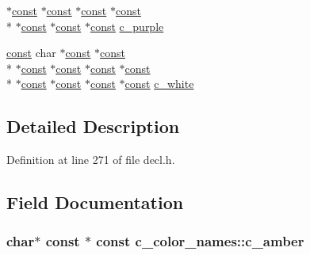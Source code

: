 \begin{DoxyCompactItemize}
$\ast$\hyperlink{tradstdc_8h_a2c212835823e3c54a8ab6d95c652660e}{const} $\ast$\hyperlink{tradstdc_8h_a2c212835823e3c54a8ab6d95c652660e}{const} $\ast$\hyperlink{tradstdc_8h_a2c212835823e3c54a8ab6d95c652660e}{const} $\ast$\hyperlink{tradstdc_8h_a2c212835823e3c54a8ab6d95c652660e}{const} \\*
$\ast$\hyperlink{tradstdc_8h_a2c212835823e3c54a8ab6d95c652660e}{const} $\ast$\hyperlink{tradstdc_8h_a2c212835823e3c54a8ab6d95c652660e}{const} $\ast$\hyperlink{tradstdc_8h_a2c212835823e3c54a8ab6d95c652660e}{const} \hyperlink{structc__color__names_a67c3d57a3672c8c1b0f0224442df81c4}{c\+\_\+purple}
\item 
\hyperlink{tradstdc_8h_a2c212835823e3c54a8ab6d95c652660e}{const} char $\ast$\hyperlink{tradstdc_8h_a2c212835823e3c54a8ab6d95c652660e}{const} $\ast$\hyperlink{tradstdc_8h_a2c212835823e3c54a8ab6d95c652660e}{const} \\*
$\ast$\hyperlink{tradstdc_8h_a2c212835823e3c54a8ab6d95c652660e}{const} $\ast$\hyperlink{tradstdc_8h_a2c212835823e3c54a8ab6d95c652660e}{const} $\ast$\hyperlink{tradstdc_8h_a2c212835823e3c54a8ab6d95c652660e}{const} $\ast$\hyperlink{tradstdc_8h_a2c212835823e3c54a8ab6d95c652660e}{const} \\*
$\ast$\hyperlink{tradstdc_8h_a2c212835823e3c54a8ab6d95c652660e}{const} $\ast$\hyperlink{tradstdc_8h_a2c212835823e3c54a8ab6d95c652660e}{const} $\ast$\hyperlink{tradstdc_8h_a2c212835823e3c54a8ab6d95c652660e}{const} $\ast$\hyperlink{tradstdc_8h_a2c212835823e3c54a8ab6d95c652660e}{const} \hyperlink{structc__color__names_a7a0c40cb90968c45ecf58835f2d44114}{c\+\_\+white}
\end{DoxyCompactItemize}


\subsection{Detailed Description}


Definition at line 271 of file decl.\+h.



\subsection{Field Documentation}
\hypertarget{structc__color__names_a91cd94932db4b81e1dfd86f3babc6667}{
\subsubsection[{c\+\_\+amber}]{ char$\ast$ {\bf const} $\ast$ {\bf const} c\+\_\+color\+\_\+names\+::c\+\_\+amber}}\label{structc__color__names_a91cd94932db4b81e1dfd86f3babc6667}


